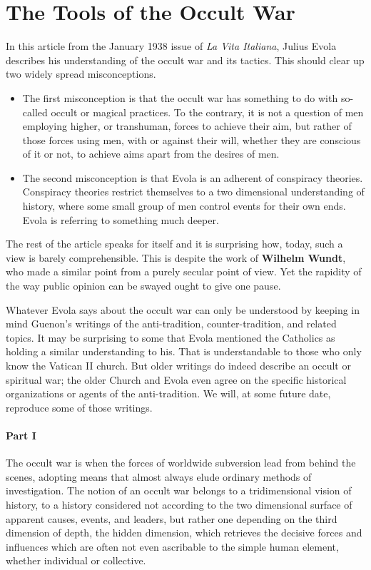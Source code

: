 \section{The Tools of the Occult War}

\begin{quotationx}
In this article from the January 1938 issue of \textit{La Vita Italiana}, Julius Evola describes his understanding of the occult war and its tactics. This should clear up two widely spread misconceptions.

\begin{itemize}


\item The first misconception is that the occult war has something to do with so-called occult or magical practices. To the contrary, it is not a question of men employing higher, or transhuman, forces to achieve their aim, but rather of those forces using men, with or against their will, whether they are conscious of it or not, to achieve aims apart from the desires of men.

\item The second misconception is that Evola is an adherent of conspiracy theories. Conspiracy theories restrict themselves to a two dimensional understanding of history, where some small group of men control events for their own ends. Evola is referring to something much deeper.
\end{itemize}

The rest of the article speaks for itself and it is surprising how, today, such a view is barely comprehensible. This is despite the work of \textbf{Wilhelm Wundt}, who made a similar point from a purely secular point of view. Yet the rapidity of the way public opinion can be swayed ought to give one pause.

Whatever Evola says about the occult war can only be understood by keeping in mind Guenon's writings of the anti-tradition, counter-tradition, and related topics. It may be surprising to some that Evola mentioned the Catholics as holding a similar understanding to his. That is understandable to those who only know the Vatican II church. But older writings do indeed describe an occult or spiritual war; the older Church and Evola even agree on the specific historical organizations or agents of the anti-tradition. We will, at some future date, reproduce some of those writings.
\end{quotationx}

\paragraph{Part I}
The occult war is when the forces of worldwide subversion lead from behind the scenes, adopting means that almost always elude ordinary methods of investigation. The notion of an occult war belongs to a tridimensional vision of history, to a history considered not according to the two dimensional surface of apparent causes, events, and leaders, but rather one depending on the third dimension of depth, the hidden dimension, which retrieves the decisive forces and influences which are often not even ascribable to the simple human element, whether individual or collective.

